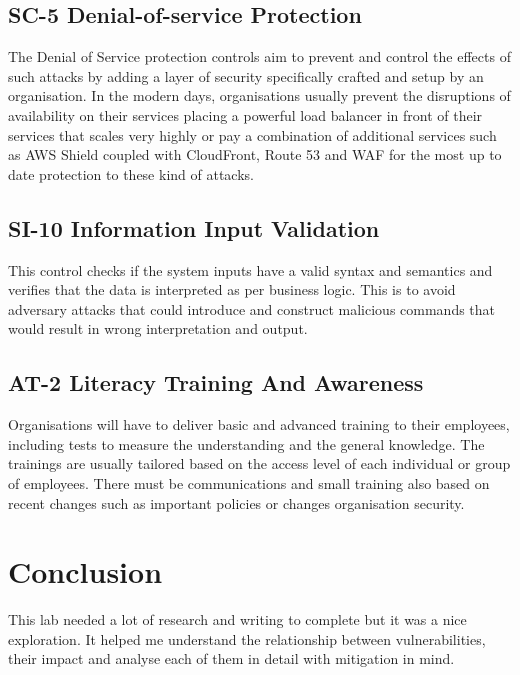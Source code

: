 \subsection{SC-5 Denial-of-service Protection}
\label{lab4-sub-4}
The Denial of Service protection controls aim to prevent and control the effects
of such attacks by adding a layer of security specifically crafted and setup by
an organisation. In the modern days, organisations usually prevent the
disruptions of availability on their services placing a powerful load balancer
in front of their services that scales very highly or pay a combination of
additional services such as AWS Shield coupled with CloudFront, Route 53 and WAF
for the most up to date protection to these kind of attacks.

\subsection{SI-10 Information Input Validation}
\label{lab4-sub-5}

This control checks if the system inputs have a valid syntax and semantics and
verifies that the data is interpreted as per business logic. This is to avoid
adversary attacks that could introduce and construct malicious commands that
would result in wrong interpretation and output.

\subsection{AT-2 Literacy Training And Awareness}
\label{lab4-sub-6}
Organisations will have to deliver basic and advanced training to their
employees, including tests to measure the understanding and the general
knowledge. The trainings are usually tailored based on the access level of each
individual or group of employees. There must be communications and small
training also based on recent changes such as important policies or changes
organisation security.

\section{Conclusion}
\label{lab4-conclusion}
This lab needed a lot of research and writing to complete but it was a nice
exploration. It helped me understand the relationship between vulnerabilities,
their impact and analyse each of them in detail with mitigation in mind.

